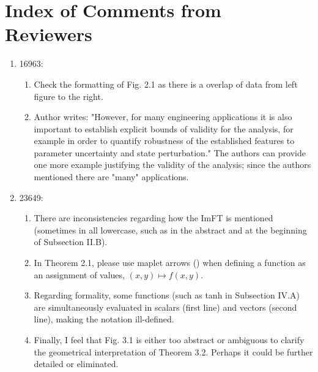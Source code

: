 \documentclass[letterpaper, 10 pt, conference, dvipsnames]{ieeeconf}
\begin{document}
\section{Index of Comments from Reviewers}
\begin{enumerate}
    \item 16963:
    \begin{enumerate}
        \item Check the formatting of Fig. 2.1 as there is a overlap of data from left figure to the right. 
        \item Author writes: "However, for many engineering applications it is also important to establish explicit bounds of validity for the analysis, for example in order to quantify robustness of the established features to parameter uncertainty and state perturbation." The authors can provide one more example justifying the validity of the analysis; since the authors mentioned there are "many" applications. 
    \end{enumerate}
    \item 23649:
    \begin{enumerate}
        \item There are inconsistencies regarding how the ImFT is mentioned (sometimes in all lowercase, such as in the abstract and at the beginning of Subsection II.B). 
        \item In Theorem 2.1, please use maplet arrows (\mapsto) when defining a function as an assignment of values, $(x,y)\mapsto f(x,y)$. 
        \item Regarding formality, some functions (such as tanh in Subsection IV.A) are simultaneously evaluated in scalars (first line) and vectors (second line), making the notation ill-defined. 
        \item Finally, I feel that Fig. 3.1 is either too abstract or ambiguous to clarify the geometrical interpretation of Theorem 3.2. Perhaps it could be further detailed or eliminated. 

\end{enumerate}
\end{enumerate}
\end{document}
